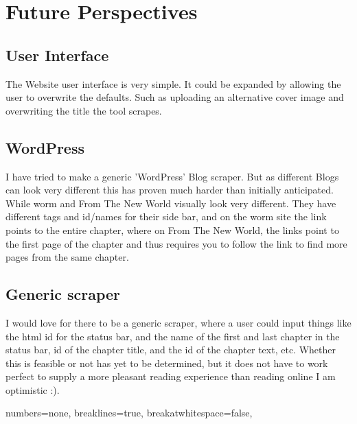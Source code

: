 \documentclass[]{report}   %
\begin{document}
\section{Future Perspectives}
\subsection{User Interface}
The Website user interface is very simple. It could be expanded by allowing the
user to overwrite the defaults. Such as uploading an alternative cover image
and overwriting the title the tool scrapes. 

\subsection{WordPress}
I have tried to make a generic 'WordPress' Blog scraper. But as different Blogs
can look very different this has proven much harder than initially anticipated.
While worm\cite{worm} and From The New World\cite{from_the_new_world} visually
look very different. They have different tags and id/names for their side bar,
and on the worm site the link points to the entire chapter, where on From The
New World, the links point to the first page of the chapter and thus requires
you to follow the link to find more pages from the same chapter.

\subsection{Generic scraper}
I would love for there to be a generic scraper, where a user could input things
like the html id for the status bar, and the name of the first and last chapter
in the status bar, id of the chapter title, and the id of the chapter text,
etc. Whether this is feasible or not has yet to be determined, but it does not
have to work perfect to supply a more pleasant reading experience than reading
online I am optimistic :). 

\lstset
{ %
    numbers=none,
    breaklines=true,
    breakatwhitespace=false,
}
\end{document}
